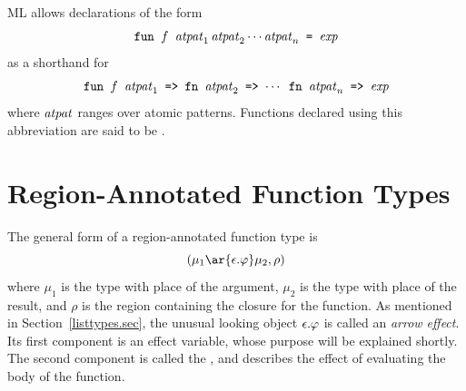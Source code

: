 \documentclass[12pt]{book}
\begin{document}
ML allows declarations of the form
%
$$\hbox{\tt fun $f$ ${\it atpat}_1\,{\it atpat}_2 \cdots {\it atpat}_n$ = $\hbox{\it exp}$}$$
as a shorthand for 
$$\hbox{\tt fun $f$ ${\it atpat}_1$ => fn ${\it atpat}_2$ => $\cdots$ fn ${\it atpat}_n$ => $\hbox{\it exp}$}$$
where ${\it atpat}$ ranges over atomic patterns.
Functions declared using this abbreviation are said to be . 

\section{Region-Annotated Function Types}
\label{functiontypes.sec}
The general form of a region-annotated 
%
%
function type is
$$(\mu_1\ar{\epsilon.\rea}\mu_2, \rho)$$
where $\mu_1$ is the
type with place of the argument, $\mu_2$ is the
type with place of the result, and $\rho$ is the region
containing the closure for the function.
As mentioned in Section~\ref{listtypes.sec}, the unusual looking object
$\epsilon.\varphi$ is called an 
%
{\em arrow effect}. Its first component
is an 
%
effect variable, whose purpose will be explained shortly.
The second component is called the , and describes
the effect of evaluating the body of the function. 
\end{document}

